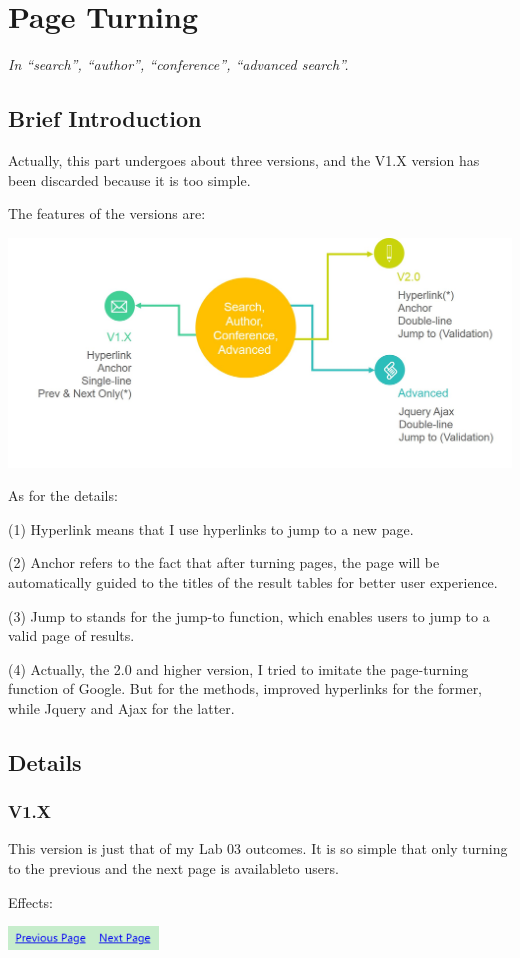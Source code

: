 \documentclass[10pt,twoside,a4paper,titlepage]{article}
\begin{document}
	\section{Page Turning}
		\emph{In “search”, “author”, “conference”, “advanced search”.}

	\subsection{Brief Introduction}
		Actually, this part undergoes about three versions, and the V1.X version has been discarded because it is too simple.\par
		The features of the versions are:\newline\par
		\includegraphics[width=1\textwidth]{gzl/03.png}\par
		As for the details:\par
		\indent\indent(1) Hyperlink means that I use hyperlinks to jump to a new page.\par
		\indent\indent(2) Anchor refers to the fact that after turning pages, the page will be automatically guided to the titles of the result tables for better user experience.\par
		\indent\indent(3) Jump to stands for the jump-to function, which enables users to jump to a valid page of results.\newline\par
		\indent\indent(4) Actually, the 2.0 and higher version, I tried to imitate the page-turning function of Google. But for the methods, improved hyperlinks for the former, while Jquery and Ajax for the latter.

	\subsection{Details}
	\subsubsection{V1.X}
		This version is just that of my Lab 03 outcomes. It is so simple that only turning to the previous and the next page is availableto users.\newline\par
		Effects:\par
			\indent\indent\includegraphics[width=0.3\textwidth]{gzl/04.png}\par
\end{document}
